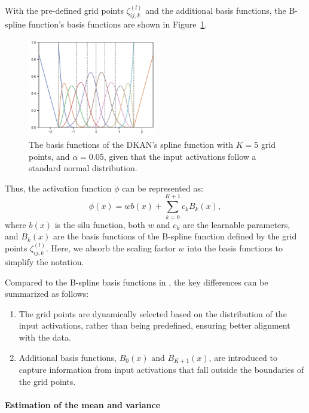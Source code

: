 \documentclass[11pt]{scrartcl}
\begin{document}
With the pre-defined grid points $\zeta_{ij,k}^{(l)}$ and the additional basis functions, the B-spline function's basis functions are shown in Figure~\ref{fig:activation-function}.

\begin{figure}[htbp]
	\centering
	\includegraphics[width=0.5\textwidth]{figures/dkan-splines.png}
	\caption{The basis functions of the DKAN's spline function with $K=5$ grid points, and $\alpha=0.05$, given that the input activations follow a standard normal distribution.}
	\label{fig:activation-function}
\end{figure}

Thus, the activation function $\phi$ can be represented as:
\begin{equation}
	\phi(x)=wb(x)+\sum_{k=0}^{K+1}c_{k}B_{k}(x),
\end{equation}
where $b(x)$ is the silu function, both $w$ and $c_{k}$ are the learnable parameters, and $B_{k}(x)$ are the basis functions of the B-spline function defined by the grid points $\zeta_{ij,k}^{(l)}$. Here, we absorb the scaling factor $w$ into the basis functions to simplify the notation.

Compared to the B-spline basis functions in \citet{liu2024kan}, the key differences can be summarized as follows:
\begin{enumerate}
	\item The grid points are dynamically selected based on the distribution of the input activations, rather than being predefined, ensuring better alignment with the data.
	\item Additional basis functions, $B_{0}(x)$ and $B_{K+1}(x)$, are introduced to capture information from input activations that fall outside the boundaries of the grid points.
\end{enumerate}

\paragraph*{Estimation of the mean and variance}
\end{document}

